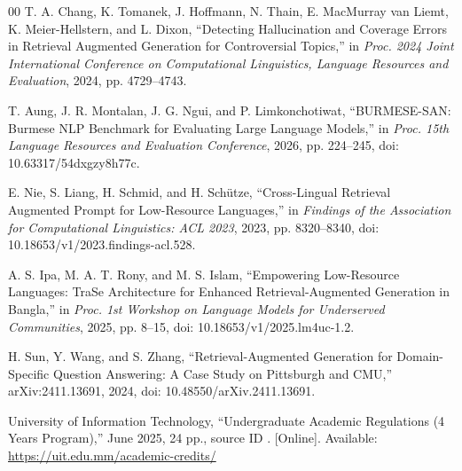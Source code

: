 \documentclass[a4paper,conference]{IEEEtran}
\newcommand{\code}[1]{\texttt{\detokenize{#1}}}
\begin{document}
\begin{thebibliography}{00}
T. A. Chang, K. Tomanek, J. Hoffmann, N. Thain, E. MacMurray van Liemt, K. Meier-Hellstern, and L. Dixon, ``Detecting Hallucination and Coverage Errors in Retrieval Augmented Generation for Controversial Topics,'' in \emph{Proc. 2024 Joint International Conference on Computational Linguistics, Language Resources and Evaluation}, 2024, pp. 4729--4743.

T. Aung, J. R. Montalan, J. G. Ngui, and P. Limkonchotiwat, ``BURMESE-SAN: Burmese NLP Benchmark for Evaluating Large Language Models,'' in \emph{Proc. 15th Language Resources and Evaluation Conference}, 2026, pp. 224--245, doi: 10.63317/54dxgzy8h77c.

E. Nie, S. Liang, H. Schmid, and H. Sch\"utze, ``Cross-Lingual Retrieval Augmented Prompt for Low-Resource Languages,'' in \emph{Findings of the Association for Computational Linguistics: ACL 2023}, 2023, pp. 8320--8340, doi: 10.18653/v1/2023.findings-acl.528.

A. S. Ipa, M. A. T. Rony, and M. S. Islam, ``Empowering Low-Resource Languages: TraSe Architecture for Enhanced Retrieval-Augmented Generation in Bangla,'' in \emph{Proc. 1st Workshop on Language Models for Underserved Communities}, 2025, pp. 8--15, doi: 10.18653/v1/2025.lm4uc-1.2.

H. Sun, Y. Wang, and S. Zhang, ``Retrieval-Augmented Generation for Domain-Specific Question Answering: A Case Study on Pittsburgh and CMU,'' arXiv:2411.13691, 2024, doi: 10.48550/arXiv.2411.13691.

University of Information Technology, ``Undergraduate Academic Regulations (4 Years Program),'' June 2025, 24 pp., source ID \code{UIT-SRC-025}. [Online]. Available: \url{https://uit.edu.mm/academic-credits/}
\end{thebibliography}
\end{document}
